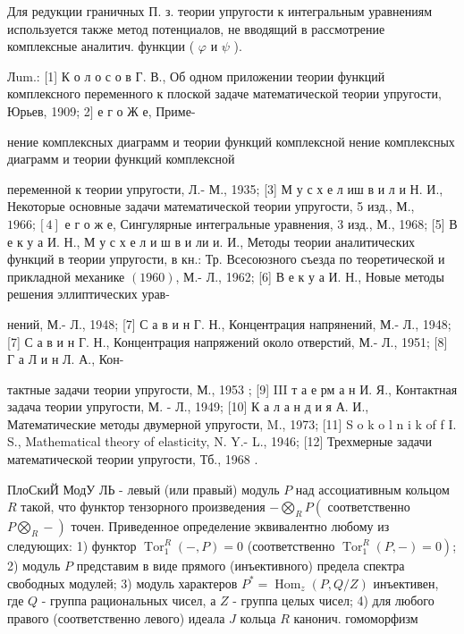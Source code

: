 \documentclass[10pt]{article}
\begin{document}
Для редукции граничных П. з. теории упругости к интегральным уравнениям используется также метод потенциалов, не вводящий в рассмотрение комплексные аналитич. функции ( $\varphi$ и $\psi$ ).



Лum.: [1] К о л о с о в Г. В., Об одном приложении теории функций комплексного переменного к плоской задаче математической теории упругости, Юрьев, 1909; 2$]$ е г о Ж е, Приме-

нение комплексных диаграмм и теории функций комплексной нение комплексных диаграмм и теории функций комплексной

переменной к теории упругости, Л.- М., 1935; [3] М у с х е л иш в и л и Н. И., Некоторые основные задачи математической теории упругости, 5 изд., М., $1966 ;[4]$ е г о ж е, Сингулярные интегральные уравнения, 3 изд., М., 1968; [5] В е к у а И. Н., М у с х е л и ш в и ли и. И., Методы теории аналитических функций в теории упругости, в кн.: Тр. Всесоюзного съезда по теоретической и прикладной механике $(1960)$, М.- Л., 1962; [6] В е к у а И. Н., Новые методы решения эллиптических урав-

нений, М.- Л., 1948; [7] С а в и н Г. Н., Концентрация напрянений, М.- Л., 1948; [7] С а в и н Г. Н., Концентрация напряжений около отверстий, М.- Л., 1951; [8] Г а Л и н Л. А., Кон-

тактные задачи теории упругости, М., 1953 ; [9] III т а е рм а н И. Я., Контактная задача теории упругости, М. - Л., 1949; [10] К а л а н д и я А. И., Математические методы двумерной упругости, M., 1973; [11] S o k o l n i k of f I. S., Mathematical theory of elasticity, N. Y.- L., 1946; [12] Трехмерные задачи математической теории упругости, Тб., 1968 .



ПлоСкиЙ МодУ ЛЬ - левый (или правый) модуль $P$ над ассоциативным кольцом $R$ такой, что функтор тензорного произведения $-\bigotimes_{R} P\left(\right.$ соответственно $\left.P \bigotimes_{R}-\right)$ точен. Приведенное определение эквивалентно любому из следующих: 1) функтор $\operatorname{Tor}_{1}^{R}(-, P)=0$ (соответственно $\left.\operatorname{Tor}_{1}^{R}(P,-)=0\right)$; 2) модуль $P$ представим в виде прямого (инъективного) предела спектра свободных модулей; 3) модуль характеров $P^{*}=\operatorname{Hom}_{z}(P, Q / Z)$ инъективен, где $Q$ - группа рациональных чисел, а $Z$ - группа целых чисел; 4) для любого правого (соответственно левого) идеала $J$ кольца $R$ канонич. гомоморфизм
\end{document}
